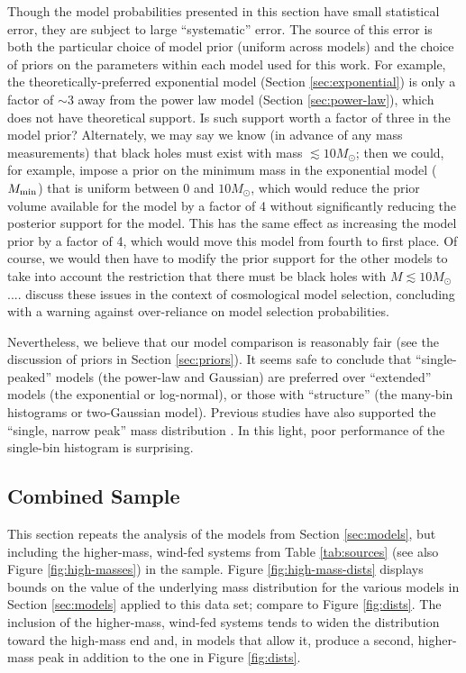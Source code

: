 \documentclass[preprint]{aastex}
\newcommand{\Msun}{M_\odot}
\newcommand{\Mmin}{M_{\textnormal{min}}}
\begin{document}
Though the model probabilities presented in this section have small
statistical error, they are subject to large ``systematic'' error.
The source of this error is both the particular choice of model prior
(uniform across models) and the choice of priors on the parameters
within each model used for this work.  For example, the
theoretically-preferred exponential model (Section
\ref{sec:exponential}) is only a factor of $\sim 3$ away from the
power law model (Section \ref{sec:power-law}), which does not have
theoretical support.  Is such support worth a factor of three in the
model prior?  Alternately, we may say we know (in advance of any mass
measurements) that black holes must exist with mass $\lesssim
10\Msun$; then we could, for example, impose a prior on the minimum
mass in the exponential model ($\Mmin$) that is uniform between $0$
and $10 \Msun$, which would reduce the prior volume available for the
model by a factor of 4 without significantly reducing the posterior
support for the model.  This has the same effect as increasing the
model prior by a factor of 4, which would move this model from fourth
to first place.  Of course, we would then have to modify the prior
support for the other models to take into account the restriction that
there must be black holes with $M \lesssim 10\Msun$....
\citet{Linder2008} discuss these issues in the context of cosmological
model selection, concluding with a warning against over-reliance on
model selection probabilities.

Nevertheless, we believe that our model comparison is reasonably fair
(see the discussion of priors in Section \ref{sec:priors}).  It seems
safe to conclude that ``single-peaked'' models (the power-law and
Gaussian) are preferred over ``extended'' models (the exponential or
log-normal), or those with ``structure'' (the many-bin histograms or
two-Gaussian model).  Previous studies have also supported the
``single, narrow peak'' mass distribution \citep{Bailyn1998,Ozel2010}.
In this light, poor performance of the single-bin histogram is
surprising.

\subsection{Combined Sample}
\label{sec:higher-mass}

This section repeats the analysis of the models from Section
\ref{sec:models}, but including the higher-mass, wind-fed systems from
Table \ref{tab:sources} (see also Figure \ref{fig:high-masses}) in the
sample.  Figure \ref{fig:high-mass-dists} displays bounds on the value
of the underlying mass distribution for the various models in Section
\ref{sec:models} applied to this data set; compare to Figure
\ref{fig:dists}.  The inclusion of the higher-mass, wind-fed systems
tends to widen the distribution toward the high-mass end and, in
models that allow it, produce a second, higher-mass peak in addition
to the one in Figure \ref{fig:dists}.
\end{document}
